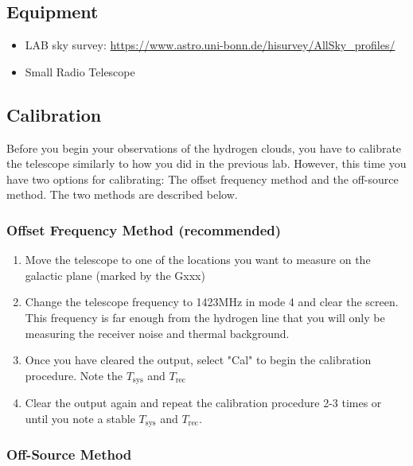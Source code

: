 \subsection{Equipment}
\begin{itemize}
	\item LAB sky survey: \url{https://www.astro.uni-bonn.de/hisurvey/AllSky_profiles/}
	\item Small Radio Telescope
\end{itemize}


\subsection{Calibration}
Before you begin your observations of the hydrogen clouds, you have to calibrate the telescope similarly to how you did in the previous lab. However, this time you have two options for calibrating: The offset frequency method and the off-source method. The two methods are described below.

\subsubsection{Offset Frequency Method (recommended)}
\begin{enumerate}
	\item Move the telescope to one of the locations you want to measure on the galactic plane (marked by the Gxxx)
	
	\item Change the telescope frequency to 1423MHz in mode 4 and clear the screen. This frequency is far enough from the hydrogen line that you will only be measuring the receiver noise and thermal background.
	
	\item Once you have cleared the output, select "Cal" to begin the calibration procedure. Note the $T_\textrm{sys}$ and $T_\textrm{rec}$
	
	\item Clear the output again and repeat the calibration procedure 2-3 times or until you note a stable $T_\textrm{sys}$ and $T_\textrm{rec}$. 
\end{enumerate}

\subsubsection{Off-Source Method}

